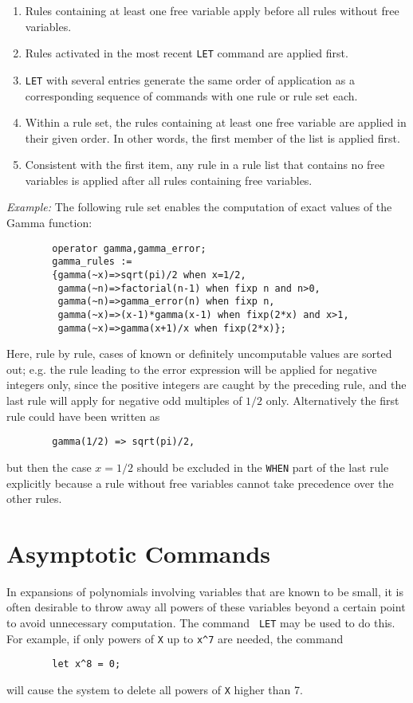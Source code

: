 \begin{enumerate}
\item Rules containing at least one free variable apply before all rules
without free variables.
\item Rules activated in the most recent {\tt LET}
command are applied first.
\item {\tt LET} with several entries generate
the same order of application as a corresponding sequence of commands with
one rule or rule set each.
\item Within a rule set, the rules containing at least
one free variable are applied in their given order.
In other words, the first member of the list is applied first.
\item Consistent with the first item, any rule in a rule list that
contains no free variables is applied after all rules containing free
variables.
\end{enumerate}
{\it Example:} The following rule set enables the computation of exact
values of the Gamma function:
\begin{verbatim}
        operator gamma,gamma_error;
        gamma_rules :=
        {gamma(~x)=>sqrt(pi)/2 when x=1/2,
         gamma(~n)=>factorial(n-1) when fixp n and n>0,
         gamma(~n)=>gamma_error(n) when fixp n,
         gamma(~x)=>(x-1)*gamma(x-1) when fixp(2*x) and x>1,
         gamma(~x)=>gamma(x+1)/x when fixp(2*x)};
\end{verbatim}
Here, rule by rule, cases of known or definitely uncomputable values
are sorted out; e.g. the rule leading to the error expression
will be applied for negative integers only, since the positive
integers are caught by the preceding rule, and the
last rule will apply for negative odd multiples of $1/2$ only.
Alternatively the first rule could have been written as
\begin{verbatim}
        gamma(1/2) => sqrt(pi)/2,
\end{verbatim}
but then the case $x=1/2$ should be excluded in the {\tt WHEN} part of the
last rule explicitly because a rule without free variables cannot take
precedence over the other rules.

\section{Asymptotic Commands} 
\label{sec-asymp}
In expansions of polynomials involving variables that are known to be
small, it is often desirable to throw away all powers of these variables
beyond a certain point to avoid unnecessary computation.  The command {\tt
LET} may be used to do this.  For example, if only powers of {\tt X} up to
{\tt x\verb|^|7} are needed, the command
\begin{verbatim}
        let x^8 = 0;
\end{verbatim}
will cause the system to delete all powers of {\tt X} higher than 7.

